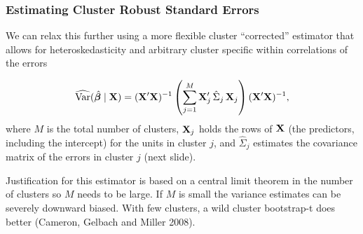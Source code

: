 \documentclass[xcolor=svgnames,9pt,english,aspectratio=169,t]{beamer}
\begin{document}




\begin{frame}[fragile]
\frametitle{Estimating Cluster Robust Standard Errors}
{\small
We can relax this further using a more flexible cluster ``corrected'' estimator that allows for heteroskedasticity and arbitrary cluster specific within correlations of the errors

\[
\widehat{\text{Var}}(\hat{\boldsymbol{\beta}}\mid\mathbf{X})=(\mathbf{X}'\mathbf{X})^{-1}\left(\sum_{j=1}^M \mathbf{X}_j'\,\hat\Sigma_j\,\mathbf{X}_j\right)(\mathbf{X}'\mathbf{X})^{-1},
\]
where $M$ is the total number of clusters, $\mathbf{X}_j$ holds the rows of $\mathbf{X}$ (the predictors, including the intercept) for the units in cluster $j$, and $\hat\Sigma_j$ estimates the covariance matrix of the errors in cluster $j$ (next slide).\\\bigskip

Justification for this estimator is based on a central limit theorem in the number of clusters so $M$ needs to be large. If $M$ is small the variance estimates can be severely downward biased. With few clusters, a wild cluster bootstrap-t does better (Cameron, Gelbach and Miller 2008).

}
\end{frame}
\end{document}
